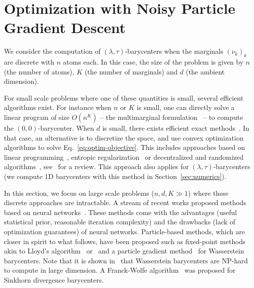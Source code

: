 \documentclass[11pt]{article}
\begin{document}
\section{Optimization with Noisy Particle Gradient Descent}\label{sec:dynamics}
We consider the computation of $(\lambda,\tau)$-barycenters when the marginals $(\nu_k)_k$ are discrete with $n$ atoms each. In this case, the size of the problem is given by $n$ (the number of atoms), $K$ (the number of marginals) and $d$ (the ambient dimension). 

For small scale problems where one of these quantities is small, several efficient algorithms exist. For instance when $n$ or $K$ is small, one can directly solve a linear program of size $O(n^K)$ -- the multimarginal formulation~\cite{agueh2011barycenters} -- to compute the $(0,0)$-barycenter. When $d$ is small, there exists efficient exact methods~\cite{altschuler2021wasserstein}. In that case, an alternative is to discretize the space, and use convex optimization algorithms to solve Eq.~\eqref{eq:optim-objective}. This includes approaches based on linear programming~\cite{anderes2016discrete, ge2019interior},  entropic regularization~\cite{cuturi2014fast, benamou2015iterative} or decentralized and randomized algorithms~\cite{ dvurechenskii2018decentralize,staib2017parallel,heinemann2022randomized}, see~\cite{peyre2019computational} for a review. This approach also applies for $(\lambda,\tau)$-barycenters (we compute 1D barycenters with this method in Section~\ref{sec:numerics}).

In this section, we focus on large scale problems ($n,d,K\gg 1$) where these discrete approaches are intractable. A stream of recent works proposed methods based on neural networks~\cite{korotin2020continuous, cohen2020estimating, li2020continuous, fan2020scalable}. These methods come with the advantages (useful statistical prior, reasonable iteration complexity) and the drawbacks (lack of optimization guarantees) of neural networks. Particle-based methods, which are closer in spirit to what follows, have been proposed such as fixed-point methods akin to Lloyd's algorithm~\cite{alvarez2016fixed, claici2018stochastic,von2022simple,backhoff2022stochastic} or~\cite[Chap.~5]{panaretos2020invitation} and a particle gradient method~\cite{daaloul2021sampling} for Wasserstein barycenters. Note that it is shown in~\cite{altschuler2022wasserstein} that Wasserstein barycenters are NP-hard to compute in large dimension. A Franck-Wolfe algorithm~\cite{luise2019sinkhorn} was proposed for Sinkhorn divergence barycenters.
\end{document}
